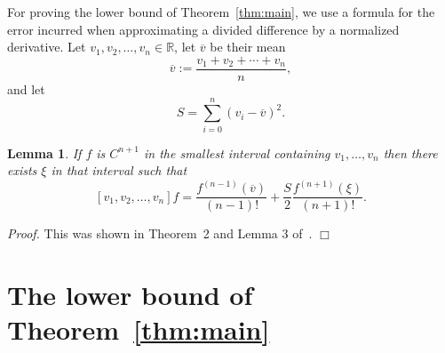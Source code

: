 \documentclass[12pt]{article}
\newcommand{\RR}{\mathbb{R}}
\def\vbar{\overline{v}}
\newtheorem{lemma}{Lemma}
\newenvironment{proof}{\begin{trivlist}\item[]{\emph{Proof.}}}
               {\hfill$\Box$\end{trivlist}}
\begin{document}
For proving the lower bound of Theorem~\ref{thm:main}, we
use a formula for the error incurred when approximating
a divided difference by a normalized derivative.
Let $v_1,v_2,\ldots,v_n \in \RR$, let
$\vbar$ be their mean
$$ \vbar := \frac{v_1 + v_2 + \cdots + v_n}{n}, $$
and let
$$ S = \sum_{i=0}^n (v_i-\vbar)^2. $$

\begin{lemma}\label{lem:ddid}
If $f$ is $C^{n+1}$ in the smallest interval containing
$v_1,\ldots,v_n$ then there exists $\xi$ in that interval such that
$$ [v_1,v_2,\ldots,v_n]f = \frac{f^{(n-1)}(\vbar)}{(n-1)!}
+ \frac{S}{2} \frac{f^{(n+1)}(\xi)}{(n+1)!}. $$
\end{lemma}

\begin{proof}
This was shown in Theorem~2 and Lemma 3 of~\cite{Floater:2003}.
\end{proof}

\section{The lower bound of Theorem~\ref{thm:main}}
\end{document}
